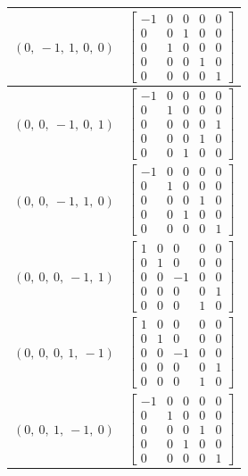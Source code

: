 \documentclass[11pt]{article}
\theoremstyle{definition}
\begin{document}
\begin{longtable}{|l|c|}
    \hline
    $\left( 0, \  -1, \  1, \  0, \  0\right)$ & ${\left[\begin{matrix}-1 & 0 & 0 & 0 & 0\\0 & 0 & 1 & 0 & 0\\0 & 1 & 0 & 0 & 0\\0 & 0 & 0 & 1 & 0\\0 & 0 & 0 & 0 & 1\end{matrix}\right]}$ \\
    \hline
    $\left( 0, \  0, \  -1, \  0, \  1\right)$ & ${\left[\begin{matrix}-1 & 0 & 0 & 0 & 0\\0 & 1 & 0 & 0 & 0\\0 & 0 & 0 & 0 & 1\\0 & 0 & 0 & 1 & 0\\0 & 0 & 1 & 0 & 0\end{matrix}\right]}$ \\
    \hline
    $\left( 0, \  0, \  -1, \  1, \  0\right)$ & ${\left[\begin{matrix}-1 & 0 & 0 & 0 & 0\\0 & 1 & 0 & 0 & 0\\0 & 0 & 0 & 1 & 0\\0 & 0 & 1 & 0 & 0\\0 & 0 & 0 & 0 & 1\end{matrix}\right]}$ \\
    \hline
    $\left( 0, \  0, \  0, \  -1, \  1\right)$ & ${\left[\begin{matrix}1 & 0 & 0 & 0 & 0\\0 & 1 & 0 & 0 & 0\\0 & 0 & -1 & 0 & 0\\0 & 0 & 0 & 0 & 1\\0 & 0 & 0 & 1 & 0\end{matrix}\right]}$ \\
    \hline
    $\left( 0, \  0, \  0, \  1, \  -1\right)$ & ${\left[\begin{matrix}1 & 0 & 0 & 0 & 0\\0 & 1 & 0 & 0 & 0\\0 & 0 & -1 & 0 & 0\\0 & 0 & 0 & 0 & 1\\0 & 0 & 0 & 1 & 0\end{matrix}\right]}$ \\
    \hline
    $\left( 0, \  0, \  1, \  -1, \  0\right)$ & ${\left[\begin{matrix}-1 & 0 & 0 & 0 & 0\\0 & 1 & 0 & 0 & 0\\0 & 0 & 0 & 1 & 0\\0 & 0 & 1 & 0 & 0\\0 & 0 & 0 & 0 & 1\end{matrix}\right]}$ \\

\end{longtable}
\end{document}
